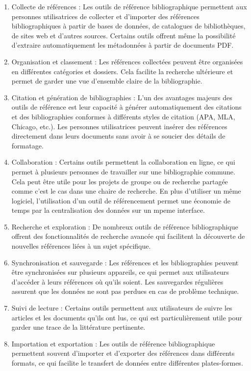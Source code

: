 \documentclass[
  letterpaper,
]{scrbook}
\begin{document}
\begin{enumerate}
\def\labelenumi{\arabic{enumi}.}
\item
  Collecte de références : Les outils de référence bibliographique
  permettent aux personnes utilisatrices de collecter et d'importer des
  références bibliographiques à partir de bases de données, de
  catalogues de bibliothèques, de sites web et d'autres sources.
  Certains outils offrent même la possibilité d'extraire automatiquement
  les métadonnées à partir de documents PDF.
\item
  Organisation et classement : Les références collectées peuvent être
  organisées en différentes catégories et dossiers. Cela facilite la
  recherche ultérieure et permet de garder une vue d'ensemble claire de
  la bibliographie.
\item
  Citation et génération de bibliographies : L'un des avantages majeurs
  des outils de référence est leur capacité à générer automatiquement
  des citations et des bibliographies conformes à différents styles de
  citation (APA, MLA, Chicago, etc.). Les personnes utilisatrices
  peuvent insérer des références directement dans leurs documents sans
  avoir à se soucier des détails de formatage.
\item
  Collaboration : Certains outils permettent la collaboration en ligne,
  ce qui permet à plusieurs personnes de travailler sur une
  bibliographie commune. Cela peut être utile pour les projets de groupe
  ou de recherche partagée comme c'est le cas dans une chaire de
  recherche. En plus d'utiliser un même logiciel, l'utilisation d'un
  outil de référencement permet une économie de temps par la
  centralisation des données sur un mpeme interface.
\item
  Recherche et exploration : De nombreux outils de référence
  bibliographique offrent des fonctionnalités de recherche avancée qui
  facilitent la découverte de nouvelles références liées à un sujet
  spécifique.
\item
  Synchronisation et sauvegarde : Les références et les bibliographies
  peuvent être synchronisées sur plusieurs appareils, ce qui permet aux
  utilisateurs d'accéder à leurs références où qu'ils soient. Les
  sauvegardes régulières assurent que les données ne sont pas perdues en
  cas de problème technique.
\item
  Suivi de lecture : Certains outils permettent aux utilisateurs de
  suivre les articles et les documents qu'ils ont lus, ce qui est
  particulièrement utile pour garder une trace de la littérature
  pertinente.
\item
  Importation et exportation : Les outils de référence bibliographique
  permettent souvent d'importer et d'exporter des références dans
  différents formats, ce qui facilite le transfert de données entre
  différentes plates-formes.
\end{enumerate}
\end{document}
